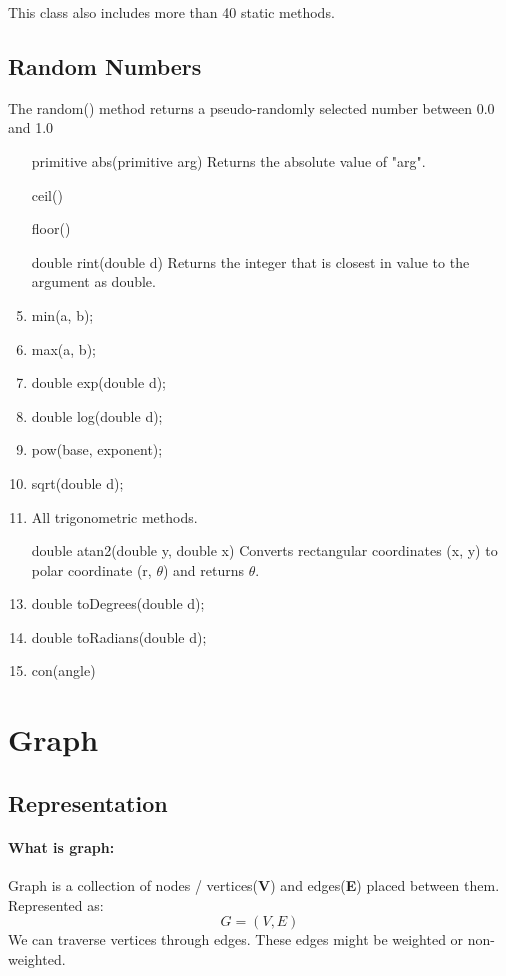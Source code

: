 \documentclass[10 pt]{book}
\begin{document}
This class also includes more than 40 static methods.
	\begin{enumerate}
	
\subsection{Random Numbers}
The random() method returns a pseudo-randomly selected number between 0.0 and 1.0
	\begin{enumerate}
		\item[primitive abs(primitive arg)] Returns the absolute value of "arg".
		\item[ceil()]
		\item[floor()]
		\item[double rint(double d)] Returns the integer that is closest in value to the argument as double.
		\item min(a, b);
		\item max(a, b);
		\item double exp(double d);
		\item double log(double d);
		\item pow(base, exponent);
		\item sqrt(double d);
		\item All trigonometric methods.
		\item [double atan2(double y, double x)] Converts rectangular coordinates (x, y) to polar coordinate (r, $\theta$) and returns $\theta$.
		\item double toDegrees(double d);
		\item double toRadians(double d);
		\item con(angle)
	\end{enumerate}

\section{Graph}

\subsection{Representation}

\paragraph{What is graph:}
Graph is a collection of nodes / vertices(\textbf{V}) and edges(\textbf{E}) placed between them. Represented as: $$G = (V, E)$$ We can traverse vertices through edges. These edges might be weighted or non-weighted.


\end{enumerate}
\end{document}

